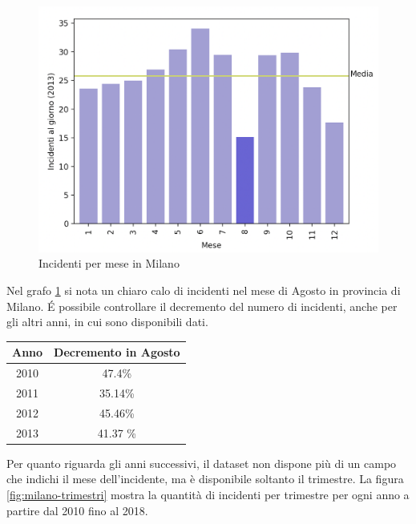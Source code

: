 \documentclass[a4paper]{report}
\begin{document}
\begin{figure}
    \includegraphics[width=\linewidth]{../src/incidenti/incidenti_senza_coords/mese_incidenti/milano_mese.png}
    \caption{Incidenti per mese in Milano}
    \label{fig:milano-mese}
\end{figure}

Nel grafo \ref{fig:milano-mese} si nota un chiaro calo di incidenti 
nel mese di Agosto in provincia di Milano.
\'E possibile controllare il decremento del numero di incidenti, anche per gli altri anni, 
in cui sono disponibili dati.

\begin{center}
    \def\arraystretch{1.5}%
    \begin{tabular}{ |c|c| } 
    \hline
    Anno & Decremento in Agosto \\ 
    \hline
    2010 & 47.4\%  \\ 
    \rowcolor{TableGray}
    2011 & 35.14\% \\
    2012 & 45.46\% \\
    \rowcolor{TableGray}
    2013 & 41.37 \% \\
    \hline
    \end{tabular}
\end{center}

Per quanto riguarda gli anni successivi, il dataset non dispone più di un campo che indichi il mese 
dell'incidente, ma è disponibile soltanto il trimestre.
La figura \ref{fig:milano-trimestri} mostra la quantità di incidenti per trimestre per ogni 
anno a partire dal 2010 fino al 2018.
\end{document}
